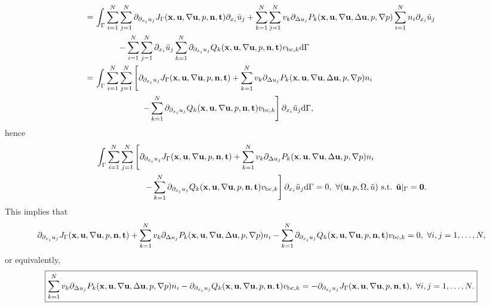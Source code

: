 \documentclass[oneside]{book}
\numberwithin{equation}{section}
\begin{document}
\begin{itemize}[leftmargin=0in]
\begin{itemize}
\begin{align*}
            =&\, \int_\Gamma \sum_{i=1}^N\sum_{j=1}^N \partial_{\partial_{x_i}u_j}J_\Gamma({\bf x},{\bf u},\nabla{\bf u},p,{\bf n},{\bf t})\partial_{x_i}\tilde{u}_j + \sum_{k=1}^N\sum_{j=1}^N v_k\partial_{\Delta u_j}P_k({\bf x},{\bf u},\nabla{\bf u},\Delta{\bf u},p,\nabla p)\sum_{i=1}^N n_i\partial_{x_i}\tilde{u}_j\\
            &\hspace{1cm}- \sum_{i=1}^N\sum_{j=1}^N \partial_{x_i}\tilde{u}_j\sum_{k=1}^N\partial_{\partial_{x_i}u_j}Q_k({\bf x},{\bf u},\nabla{\bf u},p,{\bf n},{\bf t})v_{{\rm bc},k}{\rm d}\Gamma\\
            =&\, \int_\Gamma \sum_{i=1}^N\sum_{j=1}^N \left[\partial_{\partial_{x_i}u_j}J_\Gamma({\bf x},{\bf u},\nabla{\bf u},p,{\bf n},{\bf t}) + \sum_{k=1}^N v_k\partial_{\Delta u_j}P_k({\bf x},{\bf u},\nabla{\bf u},\Delta{\bf u},p,\nabla p)n_i\right.\\
            &\hspace{2cm}\left. - \sum_{k=1}^N \partial_{\partial_{x_i}u_j}Q_k({\bf x},{\bf u},\nabla{\bf u},p,{\bf n},{\bf t})v_{{\rm bc},k}\right]\partial_{x_i}\tilde{u}_j{\rm d}\Gamma,
        \end{align*}
        hence
        \begin{align*}
            &\int_\Gamma \sum_{i=1}^N\sum_{j=1}^N \left[\partial_{\partial_{x_i}u_j}J_\Gamma({\bf x},{\bf u},\nabla{\bf u},p,{\bf n},{\bf t}) + \sum_{k=1}^N v_k\partial_{\Delta u_j}P_k({\bf x},{\bf u},\nabla{\bf u},\Delta{\bf u},p,\nabla p)n_i\right.\\
            &\hspace{2cm}\left. - \sum_{k=1}^N \partial_{\partial_{x_i}u_j}Q_k({\bf x},{\bf u},\nabla{\bf u},p,{\bf n},{\bf t})v_{{\rm bc},k}\right]\partial_{x_i}\tilde{u}_j{\rm d}\Gamma = 0,\ \forall({\bf u},p,\Omega,\tilde{u}) \mbox{ s.t. } \tilde{\bf u}|_\Gamma = {\bf 0}.
        \end{align*}
        This implies that
        \begin{align*}
            \partial_{\partial_{x_i}u_j}J_\Gamma({\bf x},{\bf u},\nabla{\bf u},p,{\bf n},{\bf t}) + \sum_{k=1}^N v_k\partial_{\Delta u_j}P_k({\bf x},{\bf u},\nabla{\bf u},\Delta{\bf u},p,\nabla p)n_i - \sum_{k=1}^N \partial_{\partial_{x_i}u_j}Q_k({\bf x},{\bf u},\nabla{\bf u},p,{\bf n},{\bf t})v_{{\rm bc},k} = 0,\ \forall i,j = 1,\ldots,N,
        \end{align*}
        or equivalently,
        \begin{align*}
            \boxed{\sum_{k=1}^N v_k\partial_{\Delta u_j}P_k({\bf x},{\bf u},\nabla{\bf u},\Delta{\bf u},p,\nabla p)n_i - \partial_{\partial_{x_i}u_j}Q_k({\bf x},{\bf u},\nabla{\bf u},p,{\bf n},{\bf t})v_{{\rm bc},k} = -\partial_{\partial_{x_i}u_j}J_\Gamma({\bf x},{\bf u},\nabla{\bf u},p,{\bf n},{\bf t}),\ \forall i,j = 1,\ldots,N.}

\end{align*}
\end{itemize}
\end{itemize}
\end{document}
